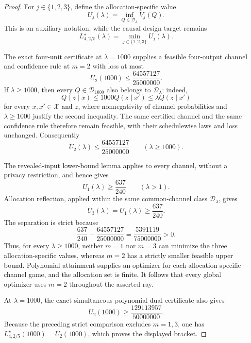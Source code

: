 \documentclass{article}
\begin{document}
\begin{proof}
For \(j\in\{1,2,3\}\), define the allocation-specific value
\[
 U_j(\lambda)=\inf_{Q\in\mathcal D_\lambda}V_j(Q).
\]
This is an auxiliary notation, while the causal design target remains
\[
 L^\star_{4,2/5}(\lambda)=\min_{j\in\{1,2,3\}}U_j(\lambda).
\]

The exact four-unit certificate at \(\lambda=1000\) supplies a feasible four-output channel and confidence rule at \(m=2\) with loss at most
\[
 U_2(1000)\le \frac{64557127}{25000000}.
\]
If \(\lambda\ge1000\), then every \(Q\in\mathcal D_{1000}\) also belongs to \(\mathcal D_\lambda\): indeed,
\[
 Q(z\mid x)\le1000Q(z\mid x')
 \le\lambda Q(z\mid x')
\]
for every \(x,x'\in\mathcal X\) and \(z\), where nonnegativity of channel probabilities and \(\lambda\ge1000\) justify the second inequality. The same certified channel and the same confidence rule therefore remain feasible, with their schedulewise laws and loss unchanged. Consequently
\[
 U_2(\lambda)\le \frac{64557127}{25000000}
 \qquad(\lambda\ge1000).
\]

The revealed-input lower-bound lemma applies to every channel, without a privacy restriction, and hence gives
\[
 U_1(\lambda)\ge\frac{637}{240}
 \qquad(\lambda>1).
\]
Allocation reflection, applied within the same common-channel class \(\mathcal D_\lambda\), gives
\[
 U_3(\lambda)=U_1(\lambda)\ge\frac{637}{240}.
\]
The separation is strict because
\[
 \frac{637}{240}-\frac{64557127}{25000000}
 =\frac{5391119}{75000000}>0.
\]
Thus, for every \(\lambda\ge1000\), neither \(m=1\) nor \(m=3\) can minimize the three allocation-specific values, whereas \(m=2\) has a strictly smaller feasible upper bound. Polynomial attainment supplies an optimizer for each allocation-specific channel game, and the allocation set is finite. It follows that every global optimizer uses \(m=2\) throughout the asserted ray.

At \(\lambda=1000\), the exact simultaneous polynomial-dual certificate also gives
\[
 U_2(1000)\ge\frac{129113957}{50000000}.
\]
Because the preceding strict comparison excludes \(m=1,3\), one has \(L^\star_{4,2/5}(1000)=U_2(1000)\), which proves the displayed bracket.


\end{proof}
\end{document}
